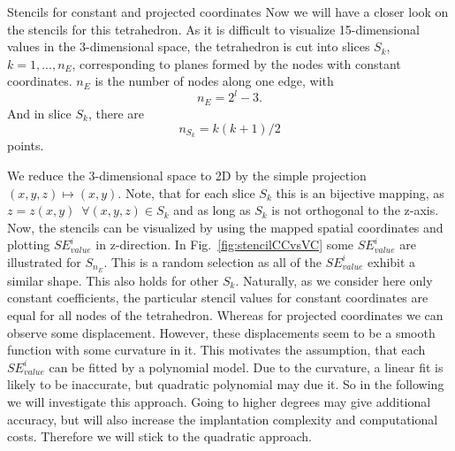 \documentclass[a4paper,11pt,reqno]{amsart}
\numberwithin{figure}{section}
\numberwithin{table}{section}
\def\si{SE_{value}^i}
\begin{document}
\begin{section}{Stencils for constant and projected coordinates}
Now we will have a closer look on the stencils for this tetrahedron. As it is difficult 
to visualize 15-dimensional values in the 3-dimensional space, the tetrahedron is
cut into slices $S_k$, $k = 1,...,n_E$, corresponding to planes formed by the nodes
with constant coordinates.
$n_E$ is the number of nodes along one edge, with
\begin{equation}
n_E = 2^l-3.
\end{equation}
And in slice $S_k$, there are
\begin{equation}
n_{S_k} = k(k+1)/2
\end{equation}
points.

We reduce the 3-dimensional space to 2D by the simple projection $(x,y,z) \mapsto (x,y)$.
Note, that for each slice $S_k$ this is an bijective mapping, as 
$z = z(x,y)\enspace\forall(x,y,z)\in S_k$ and as long as $S_k$ is not orthogonal to the
z-axis. Now, the stencils can be visualized by using
the mapped spatial coordinates and plotting $\si$ in z-direction. 
In Fig.~\ref{fig:stencilCCvsVC} some $\si$ are illustrated for $S_{n_E}$. This is a
random selection as all of the $\si$ exhibit a similar shape. This also holds for other
$S_k$.
Naturally, as we consider here only constant coefficients, the particular stencil values 
for constant coordinates are equal for all nodes of the tetrahedron. Whereas for projected
coordinates we can observe some displacement. However, these displacements seem to
be a smooth function with some curvature in it. This motivates the assumption, that each
$\si$ can be fitted by a polynomial model. Due to the curvature, a linear fit is likely 
to be inaccurate, but quadratic polynomial may due it. So in the following we will 
investigate this approach.
Going to higher degrees may give additional accuracy, but will also increase the 
implantation complexity and computational costs. Therefore we will stick to the 
quadratic approach.



\end{section}
\end{document}
